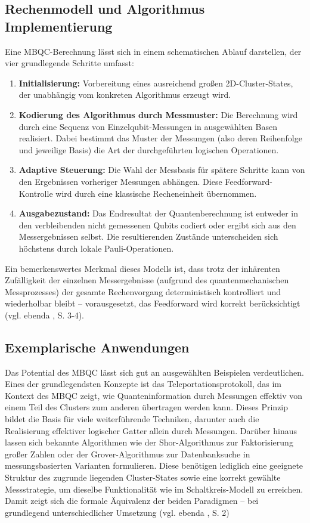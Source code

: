 \subsection*{Rechenmodell und Algorithmus Implementierung}
Eine MBQC-Berechnung lässt sich in einem schematischen Ablauf darstellen, der vier grundlegende Schritte umfasst:
\begin{enumerate}
    \item \textbf{Initialisierung:} Vorbereitung eines ausreichend großen 2D-Cluster-States, der unabhängig vom konkreten Algorithmus erzeugt wird.
    \item \textbf{Kodierung des Algorithmus durch Messmuster:} Die Berechnung wird durch eine Sequenz von Einzelqubit-Messungen in ausgewählten Basen realisiert. Dabei bestimmt das Muster der Messungen (also deren Reihenfolge und jeweilige Basis) die Art der durchgeführten logischen Operationen.
    \item \textbf{Adaptive Steuerung:} Die Wahl der Messbasis für spätere Schritte kann von den Ergebnissen vorheriger Messungen abhängen. Diese Feedforward-Kontrolle wird durch eine klassische Recheneinheit übernommen.
    \item \textbf{Ausgabezustand:} Das Endresultat der Quantenberechnung ist entweder in den verbleibenden nicht gemessenen Qubits codiert oder ergibt sich aus den Messergebnissen selbst. Die resultierenden Zustände unterscheiden sich höchstens durch lokale Pauli-Operationen.
\end{enumerate}
Ein bemerkenswertes Merkmal dieses Modells ist, dass trotz der inhärenten Zufälligkeit der einzelnen Messergebnisse (aufgrund des quantenmechanischen Messprozesses) der gesamte Rechenvorgang deterministisch kontrolliert und wiederholbar bleibt – vorausgesetzt, das Feedforward wird korrekt berücksichtigt (vgl. ebenda \citeyear{h_j_briegel_measurement-based_2009}, S. 3-4).
\subsection*{Exemplarische Anwendungen}
Das Potential des MBQC lässt sich gut an ausgewählten Beispielen verdeutlichen. Eines der grundlegendsten Konzepte ist das Teleportationsprotokoll, das im Kontext des MBQC zeigt, wie Quanteninformation durch Messungen effektiv von einem Teil des Clusters zum anderen übertragen werden kann. Dieses Prinzip bildet die Basis für viele weiterführende Techniken, darunter auch die Realisierung effektiver logischer Gatter allein durch Messungen.
Darüber hinaus lassen sich bekannte Algorithmen wie der Shor-Algorithmus zur Faktorisierung großer Zahlen oder der Grover-Algorithmus zur Datenbanksuche in messungsbasierten Varianten formulieren. Diese benötigen lediglich eine geeignete Struktur des zugrunde liegenden Cluster-States sowie eine korrekt gewählte Messstrategie, um dieselbe Funktionalität wie im Schaltkreis-Modell zu erreichen. Damit zeigt sich die formale Äquivalenz der beiden Paradigmen – bei grundlegend unterschiedlicher Umsetzung (vgl. ebenda \citeyear{h_j_briegel_measurement-based_2009}, S. 2)

